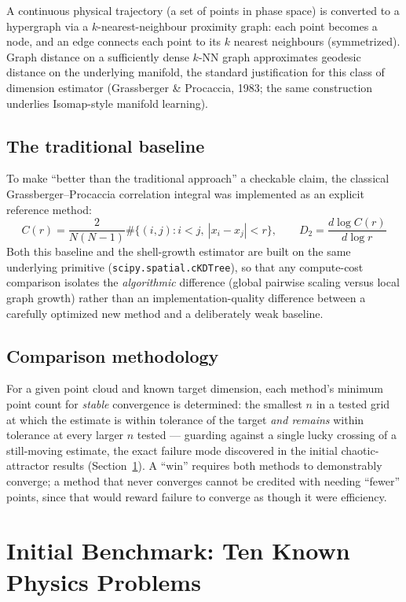\documentclass[11pt,a4paper]{article}
\begin{document}
A continuous physical trajectory (a set of points in phase space) is
converted to a hypergraph via a $k$-nearest-neighbour proximity graph: each
point becomes a node, and an edge connects each point to its $k$ nearest
neighbours (symmetrized). Graph distance on a sufficiently dense $k$-NN
graph approximates geodesic distance on the underlying manifold, the
standard justification for this class of dimension estimator
(Grassberger \& Procaccia, 1983; the same construction underlies
Isomap-style manifold learning).

\subsection{The traditional baseline}

To make ``better than the traditional approach'' a checkable claim, the
classical Grassberger--Procaccia correlation integral was implemented as
an explicit reference method:
\[
C(r) = \frac{2}{N(N-1)} \#\{(i,j) : i<j,\ |x_i - x_j| < r\}, \qquad
D_2 = \frac{d \log C(r)}{d \log r}
\]
Both this baseline and the shell-growth estimator are built on the same
underlying primitive (\texttt{scipy.spatial.cKDTree}), so that any
compute-cost comparison isolates the \emph{algorithmic} difference (global
pairwise scaling versus local graph growth) rather than an
implementation-quality difference between a carefully optimized new method
and a deliberately weak baseline.

\subsection{Comparison methodology}

For a given point cloud and known target dimension, each method's minimum
point count for \emph{stable} convergence is determined: the smallest
$n$ in a tested grid at which the estimate is within tolerance of the
target \emph{and remains} within tolerance at every larger $n$ tested ---
guarding against a single lucky crossing of a still-moving estimate, the
exact failure mode discovered in the initial chaotic-attractor results
(Section~\ref{sec:findings}). A ``win'' requires both methods to
demonstrably converge; a method that never converges cannot be credited
with needing ``fewer'' points, since that would reward failure to
converge as though it were efficiency.

\section{Initial Benchmark: Ten Known Physics Problems}
\label{sec:findings}
\end{document}
